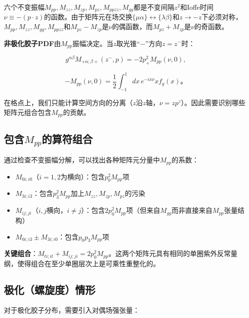 \documentclass[12pt,a4paper]{ctexart}
\theoremstyle{definition}
\begin{document}
六个不变振幅$M_{pp}, M_{zz}, M_{zp}, M_{pz}, M_{ppzz}, M_{gg}$都是不变间隔$z^2$和Ioffe时间$\nu \equiv -(p \cdot z)$的函数。由于矩阵元在场交换$\{\mu\alpha\} \leftrightarrow \{\lambda\beta\}$和$z \to -z$下必须对称，$M_{pp}, M_{zz}, M_{gg}, M_{ppzz}$和$M_{pz} - M_{zp}$是$\nu$的偶函数，而$M_{pz} + M_{zp}$是$\nu$的奇函数\cite{Balitsky2020}。

\textbf{非极化胶子PDF}由$M_{pp}$振幅决定。当$z$取光锥``$-$''方向$z = z^-$时\cite{Balitsky2020}：

\begin{equation}
g^{\alpha\beta} M_{+\alpha;\beta+}(z^-, p) = -2p^2_+ M_{pp}(\nu, 0),
\label{eq:lightcone_Mpp}
\end{equation}

\begin{equation}
-M_{pp}(\nu, 0) = \frac{1}{2} \int_{-1}^{1} dx\, e^{-ix\nu} x f_g(x)。
\label{eq:Mpp_to_pdf}
\end{equation}

在格点上，我们只能计算空间方向的分离（$z$沿$z$轴，$\nu = zp^z$）。因此需要识别哪些矩阵元组合包含$M_{pp}$的贡献。

\subsection{包含$M_{pp}$的算符组合}

通过检查不变振幅分解，可以找出各种矩阵元分量中$M_{pp}$的系数\cite{Balitsky2020}：

\begin{itemize}
    \item $M_{0i;i0}$（$i=1,2$为横向）：包含$p^2_0 M_{pp}$项
    \item $M_{3i;i3}$：包含$p^2_3 M_{pp}$加上$M_{zz}, M_{zp}, M_{pz}$的污染
    \item $M_{ij;ji}$（$i,j$横向，$i \neq j$）：包含$2p^2_0 M_{pp}$项（但来自$M_{gg}$而非直接来自$M_{pp}$张量结构）
    \item $M_{0i;i3} \pm M_{3i;i0}$：包含$p_0 p_3 M_{pp}$项
\end{itemize}

\textbf{关键组合}\cite{Balitsky2020,Chen2025gluon}：$M_{ti;it} + M_{ij;ji} = 2p^2_0 M_{pp}$。这两个矩阵元具有相同的单圈紫外反常量纲，使得组合在至少单圈层次上是可乘性重整化的。

\subsection{极化（螺旋度）情形}

对于极化胶子分布，需要引入对偶场强张量\cite{Balitsky2020,Egerer2022}：
\end{document}
